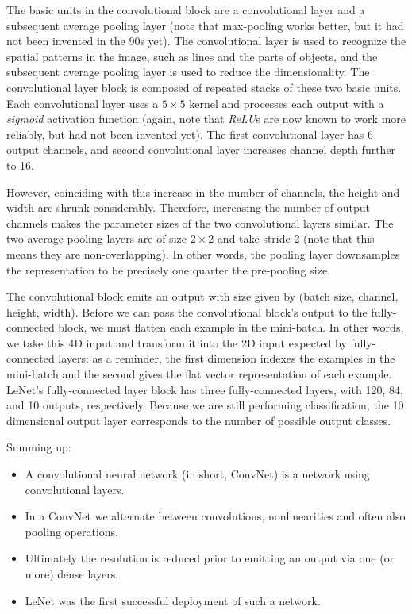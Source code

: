 The basic units in the convolutional block are a convolutional layer and a subsequent average pooling layer (note that max-pooling works better, but it had not been invented in the 90s yet). The convolutional layer is used to recognize the spatial patterns in the image, such as lines and the parts of objects, and the subsequent average pooling layer is used to reduce the dimensionality. The convolutional layer block is composed of repeated stacks of these two basic units. Each convolutional layer uses a $5 \times 5$  kernel and processes each output with a \textit{sigmoid} activation function (again, note that \textit{ReLU}s are now known to work more reliably, but had not been invented yet). The first convolutional layer has 6 output channels, and second convolutional layer increases channel depth further to 16.

However, coinciding with this increase in the number of channels, the height and width are shrunk considerably. Therefore, increasing the number of output channels makes the parameter sizes of the two convolutional layers similar. The two average pooling layers are of size  $2 \times 2$  and take stride 2 (note that this means they are non-overlapping). In other words, the pooling layer downsamples the representation to be precisely one quarter the pre-pooling size.

The convolutional block emits an output with size given by (batch size, channel, height, width). Before we can pass the convolutional block’s output to the fully-connected block, we must flatten each example in the mini-batch. In other words, we take this 4D input and transform it into the 2D input expected by fully-connected layers: as a reminder, the first dimension indexes the examples in the mini-batch and the second gives the flat vector representation of each example. LeNet’s fully-connected layer block has three fully-connected layers, with 120, 84, and 10 outputs, respectively. Because we are still performing classification, the 10 dimensional output layer corresponds to the number of possible output classes.

Summing up: 
\begin{itemize}
    \item A convolutional neural network (in short, ConvNet) is a network using convolutional layers.
    \item In a ConvNet we alternate between convolutions, nonlinearities and often also pooling operations.
    \item Ultimately the resolution is reduced prior to emitting an output via one (or more) dense layers.
    \item LeNet was the first successful deployment of such a network.
\end{itemize}

